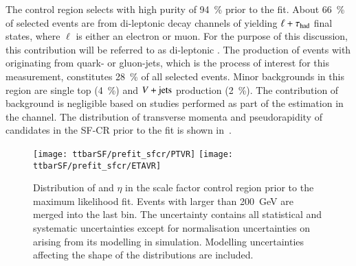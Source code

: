 
The control region selects \ttbar with high purity of
\SI{94}{\percent} prior to the fit. About \SI{66}{\percent} of
selected events are from di-leptonic decay channels of \ttbar yielding
$\ell + \tau_{\text{had}}$ final states, where $\ell$ is either an electron or
muon. For the purpose of this discussion, this contribution will be
referred to as di-leptonic \ttbar. The production of \ttbar events
with \tauhadvis originating from quark- or gluon-jets, which is the
process of interest for this measurement, constitutes
\SI{28}{\percent} of all selected events. Minor backgrounds in this
region are single top (\SI{4}{\percent}) and $V+\text{jets}$ production
(\SI{2}{\percent}). The contribution of \multijet background is
negligible based on studies performed as part of the \faketauhadvis
estimation in the \lephad channel. The distribution of transverse
momenta and pseudorapidity of \tauhadvis candidates in the SF-CR prior
to the fit is shown in~.

\begin{figure}[htbp]
  \centering

  \texttt{[image: ttbarSF/prefit\_sfcr/PTVR]}%
  \texttt{[image: ttbarSF/prefit\_sfcr/ETAVR]}

  \caption{Distribution of \tauhadvis \pT and $\eta$ in the scale
    factor control region prior to the maximum likelihood fit. Events
    with \tauhadvis \pT larger than \SI{200}{\GeV} are merged into the
    last bin. The uncertainty contains all statistical and systematic
    uncertainties except for normalisation uncertainties on \ttbar
    arising from its modelling in simulation. Modelling uncertainties
    affecting the shape of the distributions are included.}%
  \label{fig:ttbarSF_prefit_pt}
\end{figure}

